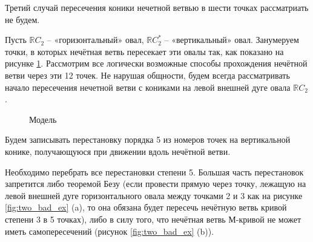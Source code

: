 \documentclass[11pt]{article}
\begin{document}
Третий случай пересечения коники нечетной ветвью в шести точках рассматриать не будем.

Пусть $\mathbb RC_2$ -- «горизонтальный» овал, $\mathbb RC_2^*$ -- «вертикальный» овал. Занумеруем точки, в которых нечётная ветвь пересекает эти овалы так, как показано на рисунке \ref{fig:model_1-5}. Рассмотрим все логически возможные способы прохождения нечётной ветви через эти 12 точек. Не нарушая общности, будем всегда рассматривать начало пересечения нечетной ветви с кониками на левой внешней дуге овала $\mathbb RC_2$. 

\begin{figure}[H]
\caption{Модель}
\label{fig:model_1-5}
\end{figure}

Будем записывать перестановку порядка 5 из номеров точек на вертикальной конике, получающуюся при движении вдоль нечётной ветви.  

Необходимо перебрать все перестановки степени 5. Большая часть перестановок запретится либо теоремой Безу (если провести прямую через точку, лежащую на левой внешней дуге горизонтального овала между точками 2 и 3 как на рисунке \ref{fig:two_bad_ex} (a), то она обязана будет пересечь нечётную ветвь кривой степени 3 в 5 точках), либо в силу того, что нечётная ветвь М-кривой не может иметь самопересечений (рисунок \ref{fig:two_bad_ex} (b)).
\end{document}
